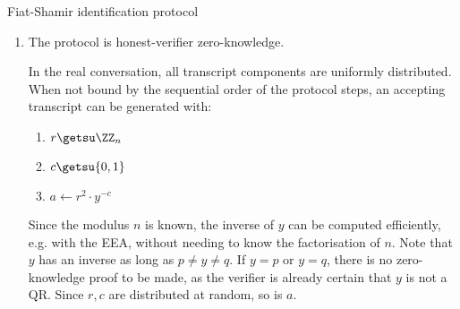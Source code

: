 \documentclass{practice}
\begin{document}
\begin{task}{Fiat-Shamir identification protocol}
\begin{enumerate}
\begin{itemize}
      If the verifier did not check whether $a$ is indeed a quadratic residue, the prover could set $a$ to be a NQR when $y$ is a NQR.
      The verification equation would then hold, and the verifier would think that $y$ is a QR when this is not the case, thus making the protocol unsound.

      Since the prover must announce $a$ before the verifier decides whether it wants to verify whether $y$ or $a$ is a QR, it cannot cheat without the risk of getting caught.
      The prover could try to guess for each protocol run whether the challenger picks $c = 0$ or $c = 1$ but the probability of guessing this correctly after $k$ protocol runs is $2^{-k}$ which can be made as small as needed.

      For example, let $y$ be an NQR.
      In an attempt to convince the verifier that $y$ is a QR, the prover selects some NQR $a$ and hopes that the verifier selects $c = 1$.
      However, if the verifier now selects $c = 0$, then $r^2 \not\equiv a$ and the verifier sees that the prover does not announce $a$ correctly and refuses to deal with the prover further.

      In summary, the verifier is convinced with probability $1/2$ that $a$ is a QR.
      By successfully repeating the protocol $k$ times, the probability increases.
      If the verifier is convinced that $a$ is a QR, then the check $r^2 \equiv ya \pmod{n}$ convinces the verifier that $y$ is a QR.
      This check happens with probability $1/2$ and so the protocol is $1/2$-sound.

      \textit{You can make this proof more formal by using a similar approach to the one in the previous exercise.
      I.e., show what happens for two transcripts with the same $a$ value, but $c = 0$ and $c' = 1$.
      Alternatively, see the proof in slide 15.}
    \end{itemize}

    \item The protocol is honest-verifier zero-knowledge.
    
    In the real conversation, all transcript components are uniformly distributed.
    When not bound by the sequential order of the protocol steps, an accepting transcript can be generated with:
    \begin{enumerate}
      \item $r \getsu \ZZ_n$
      \item $c \getsu \{0, 1\}$
      \item $a \gets r^2\cdot y^{-c}$
    \end{enumerate}
    Since the modulus $n$ is known, the inverse of $y$ can be computed efficiently, e.g. with the EEA, without needing to know the factorisation of $n$.
    Note that $y$ has an inverse as long as $p \neq y \neq q$.
    If $y = p$ or $y = q$, there is no zero-knowledge proof to be made, as the verifier is already certain that $y$ is not a QR.
    Since $r,c$ are distributed at random, so is $a$.


\end{enumerate}
\end{task}
\end{document}
